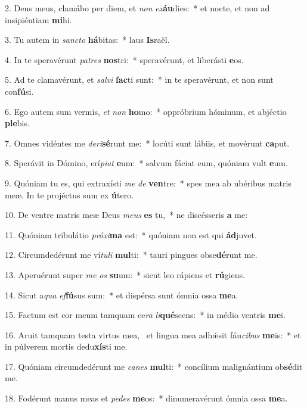 2. Deus meus, clamábo per diem, et \textit{non} \textit{ex}\textbf{áu}dies:~*  et nocte, et non ad insipiéntiam \textbf{mi}hi.\

3. Tu autem in \textit{sanc}\textit{to} \textbf{há}bitas:~*  laus \textbf{Is}raël.\

4. In te speravérunt \textit{pa}\textit{tres} \textbf{nos}tri:~*  speravérunt, et liberásti \textbf{e}os.\

5. Ad te clamavérunt, et \textit{sal}\textit{vi} \textbf{fac}ti sunt:~*  in te speravérunt, et non sunt con\textbf{fú}si.\

6. Ego autem sum vermis, \textit{et} \textit{non} \textbf{ho}mo:~*  oppróbrium hóminum, et abjéctio \textbf{ple}bis.\

7. Omnes vidéntes me \textit{de}\textit{ri}\textbf{sé}runt me:~*  locúti sunt lábiis, et movérunt \textbf{ca}put.\

8. Sperávit in Dómino, erí\textit{pi}\textit{at} \textbf{e}um:~*  salvum fáciat eum, quóniam vult \textbf{e}um.\

9. Quóniam tu es, qui extraxísti \textit{me} \textit{de} \textbf{ven}tre:~*  spes mea ab ubéribus matris meæ. In te projéctus sum ex \textbf{ú}tero.\

10. De ventre matris meæ Deus \textit{me}\textit{us} \textbf{es} tu,~*  ne discésseris \textbf{a} me:\

11. Quóniam tribulátio \textit{pró}\textit{xi}\textbf{ma} est:~*  quóniam non est qui \textbf{ád}juvet.\

12. Circumdedérunt me ví\textit{tu}\textit{li} \textbf{mul}ti:~*  tauri pingues obse\textbf{dé}runt me.\

13. Aperuérunt super \textit{me} \textit{os} \textbf{su}um:~*  sicut leo rápiens et \textbf{rú}giens.\

14. Sicut a\textit{qua} \textit{ef}\textbf{fú}sus sum:~*  et dispérsa sunt ómnia ossa \textbf{me}a.\

15. Factum est cor meum tamquam ce\textit{ra} \textit{li}\textbf{qué}scens:~*  in médio ventris \textbf{me}i.\

16. Aruit tamquam testa virtus mea, \dag\  et lingua mea adhǽsit fáu\textit{ci}\textit{bus} \textbf{me}is:~*  et in púlverem mortis dedu\textbf{xís}ti me.\

17. Quóniam circumdedérunt me \textit{ca}\textit{nes} \textbf{mul}ti:~*  concílium malignántium ob\textbf{sé}dit me.\

18. Fodérunt manus meas et \textit{pe}\textit{des} \textbf{me}os:~*  dinumeravérunt ómnia ossa \textbf{me}a.\

